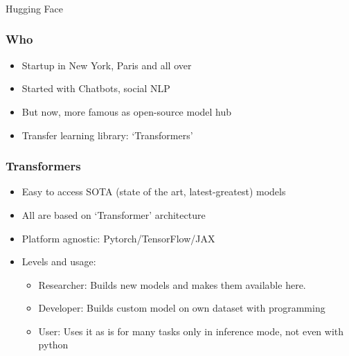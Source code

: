 




\begin{frame}[fragile]\frametitle{}
\begin{center}
{\Large Hugging Face}
\end{center}
\end{frame}

\begin{frame}[fragile]\frametitle{Who}
		\begin{itemize}
		\item Startup in New York, Paris and all over
		\item Started with Chatbots, social NLP
		\item But now, more famous as open-source model hub
		\item Transfer learning library: `Transformers'
		\end{itemize}
\end{frame}

\begin{frame}[fragile]\frametitle{Transformers}
		\begin{itemize}
		\item Easy to access SOTA (state of the art, latest-greatest) models
		\item All are based on ‘Transformer’ architecture
		\item Platform agnostic: Pytorch/TensorFlow/JAX
		\item Levels and usage:
				\begin{itemize}
				\item Researcher: Builds new models and makes them available here.
				\item Developer: Builds custom model on own dataset with programming
				\item User: Uses it as is for many tasks only in inference mode, not even with python
				\end{itemize}

		\end{itemize}
\end{frame}

